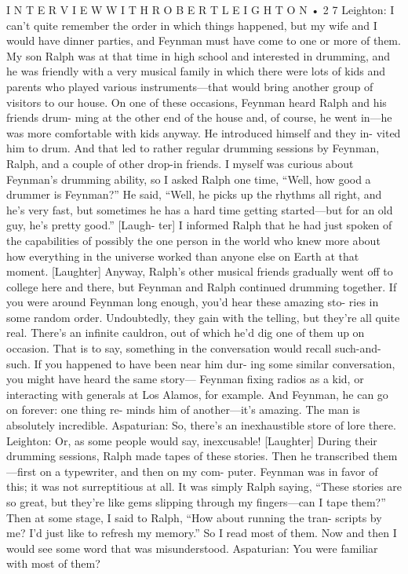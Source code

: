 \documentclass[11pt,oneside]{article}
\begin{document}
I N T E R V I E W  W I T H  R O B E R T  L E I G H T O N • 2 7 Leighton: I can’t quite remember the order in which things happened, but my wife and I would have dinner parties, and Feynman must have come to one or more of them. My son Ralph was at that time in high school and interested in drumming, and he was friendly with a very musical family in which there were lots of kids and parents who played various instruments---that would bring another group of visitors to our house. On one of these occasions, Feynman heard Ralph and his friends drum- ming at the other end of the house and, of course, he went in---he was more comfortable with kids anyway. He introduced himself and they in- vited him to drum. And that led to rather regular drumming sessions by Feynman, Ralph, and a couple of other drop-in friends. I myself was curious about Feynman’s drumming ability, so I asked Ralph one time, “Well, how good a drummer is Feynman?” He said, “Well, he picks up the rhythms all right, and he’s very fast, but sometimes he has a hard time getting started---but for an old guy, he’s pretty good.” [Laugh- ter] I informed Ralph that he had just spoken of the capabilities of possibly the one person in the world who knew more about how everything in the universe worked than anyone else on Earth at that moment. [Laughter] Anyway, Ralph’s other musical friends gradually went off to college here and there, but Feynman and Ralph continued drumming together. If you were around Feynman long enough, you’d hear these amazing sto- ries in some random order. Undoubtedly, they gain with the telling, but they’re all quite real. There’s an infinite cauldron, out of which he’d dig one of them up on occasion. That is to say, something in the conversation would recall such-and-such. If you happened to have been near him dur- ing some similar conversation, you might have heard the same story--- Feynman fixing radios as a kid, or interacting with generals at Los Alamos, for example. And Feynman, he can go on forever: one thing re- minds him of another---it’s amazing. The man is absolutely incredible. Aspaturian: So, there’s an inexhaustible store of lore there. Leighton: Or, as some people would say, inexcusable! [Laughter] During their drumming sessions, Ralph made tapes of these stories. Then he transcribed them---first on a typewriter, and then on my com- puter. Feynman was in favor of this; it was not surreptitious at all. It was simply Ralph saying, “These stories are so great, but they’re like gems slipping through my fingers---can I tape them?” Then at some stage, I said to Ralph, “How about running the tran- scripts by me? I’d just like to refresh my memory.” So I read most of them. Now and then I would see some word that was misunderstood. Aspaturian: You were familiar with most of them?\par
\end{document}
